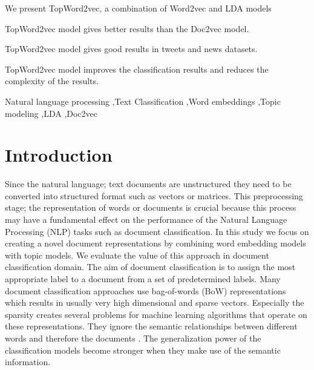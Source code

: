 \documentclass[a4paper,fleqn]{cas-dc}
\begin{document}
\begin{highlights}
    \item We present TopWord2vec, a combination of Word2vec and LDA models
	\item TopWord2vec model gives better results than the Doc2vec model.
	\item TopWord2vec model gives good results in tweets and news datasets.
	\item TopWord2vec model improves the classification results and reduces the complexity of the results.
\end{highlights}

\begin{keywords}
	Natural language processing \sep Text Classification \sep Word embeddings \sep Topic modeling \sep LDA \sep Doc2vec
\end{keywords}


\maketitle



\section{Introduction}


Since the natural language; text documents are unstructured they need to be converted into structured format such as vectors or matrices. This preprocessing stage; the representation of words or documents is crucial because this process may have a fundamental effect on the performance of the Natural Language Processing (NLP) tasks such as document classification.  In this study we focus on creating a novel document representations by combining word embedding models with topic models. We evaluate the value of this approach in document classification domain. The aim of document classification is to assign the most appropriate label to a document from a set of predetermined labels. Many document classification approaches use bag-of-words (BoW) representations which results in usually very high dimensional and sparse vectors. Especially the sparsity creates several problems for machine learning algorithms that operate on these representations. They ignore the semantic relationships between different words and therefore the documents \citep{ref1}. The generalization power of the classification models become stronger when they make use of the semantic information.  
\end{document}
